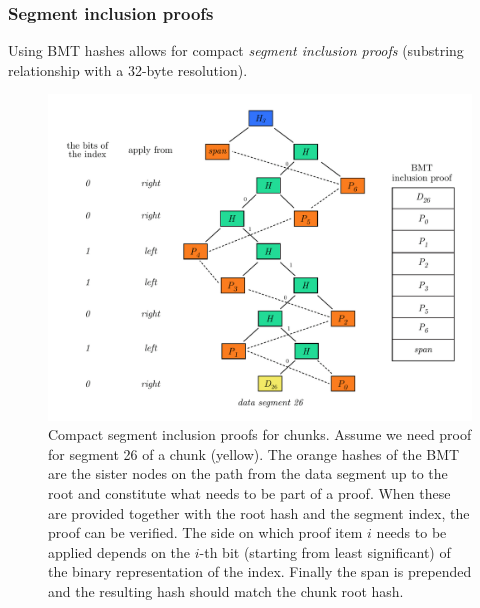 \subsubsection{Segment inclusion proofs}

Using BMT hashes allows for compact \emph{segment inclusion proofs} (substring relationship with a 32-byte resolution).

\begin{figure}[!ht]
\centering
\includegraphics[width=.85\textwidth]{fig/inclusion-proof.pdf}
\caption[Compact segment inclusion proofs for chunks ]{Compact segment inclusion proofs for chunks. Assume we need proof for segment 26 of a chunk (yellow). The orange hashes of the BMT are the sister nodes on the path from the data segment up to the root and constitute what needs to be part of a proof. When these are provided together with the root hash and the segment index, the proof can be verified. The side on which proof item $i$ needs to be applied depends on the $i$-th bit (starting from least significant) of the binary representation of the index. Finally the span is prepended and the resulting hash should match the chunk root hash.}
\label{fig:chunk-inclusion}
\end{figure}

